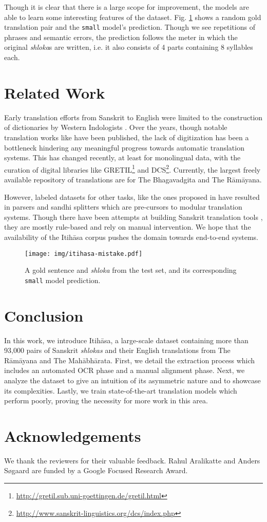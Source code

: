 \documentclass[11pt,a4paper]{article}
\newcommand\itihasa{Itih\={a}sa\xspace}
\newcommand\ramayana{The R\={a}m\={a}yana\xspace}
\newcommand\mahabharata{The Mah\={a}bh\={a}rata\xspace}
\begin{document}
\noindent Though it is clear that there is a large scope for improvement, the models are able to learn some interesting features of the dataset. Fig. \ref{fig:errors} shows a random gold translation pair and the \texttt{small} model's prediction. Though we see repetitions of phrases and semantic errors, the prediction follows the meter in which the original {\it shloka}s are written, i.e. it also consists of 4 parts containing 8 syllables each.

\section{Related Work}
Early translation efforts from Sanskrit to English were limited to the construction of dictionaries by Western Indologists \cite{muller, williams}. Over the years, though notable translation works like  have been published, the lack of digitization has been a bottleneck hindering any meaningful progress towards automatic translation systems. This has changed recently, at least for monolingual data, with the curation of digital libraries like GRETIL\footnote{\url{http://gretil.sub.uni-goettingen.de/gretil.html}} and DCS\footnote{\url{http://www.sanskrit-linguistics.org/dcs/index.php}}. Currently, the largest freely available repository of translations are for The Bhagavadgita \cite{gita-iitk} and \ramayana \cite{valmiki-iitk}.


However, labeled datasets for other tasks, like the ones proposed in \cite{treebank, sandhikosh, dcs-normal} have resulted in parsers \cite{morph-parser, struct-pred} and sandhi splitters \cite{sandhi2, sandhi1} which are pre-cursors to modular translation systems. Though there have been attempts at building Sanskrit translation tools \cite{anusaaraka}, they are mostly rule-based and rely on manual intervention. We hope that the availability of the \itihasa corpus pushes the domain towards end-to-end systems.

\begin{figure}
    \centering
    \texttt{[image: img/itihasa-mistake.pdf]}
    \caption{A gold sentence and {\it shloka} from the test set, and its corresponding \texttt{small} model prediction.}
    \label{fig:errors}
\end{figure}

\section{Conclusion}
In this work, we introduce \itihasa, a large-scale dataset containing more than 93,000 pairs of Sanskrit {\it shlokas} and their English translations from \ramayana and \mahabharata. First, we detail the extraction process which includes an automated OCR phase and a manual alignment phase. Next, we analyze the dataset to give an intuition of its asymmetric nature and to showcase its complexities. Lastly, we train state-of-the-art translation models which perform poorly, proving the necessity for more work in this area.

\section*{Acknowledgements}
We thank the reviewers for their valuable feedback. Rahul Aralikatte and Anders S{\o}gaard are funded by
a Google Focused Research Award.



\end{document}
